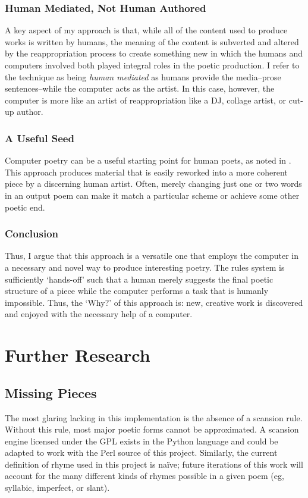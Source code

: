 \documentclass[10pt]{article}
\begin{document}
\subsubsection{Human Mediated, Not Human Authored}
A key aspect of my approach is that, while all of the content used to produce
works is written by humans, the meaning of the content is subverted and altered
by the reappropriation process to create something new in which the humans and
computers involved both played integral roles in the poetic production. I refer
to the technique as being \emph{human mediated} as humans provide the
media--prose sentences--while the computer acts as the artist. In this case,
however, the computer is more like an artist of reappropriation like a DJ,
collage artist, or cut-up author.

\subsubsection{A Useful Seed}
Computer poetry can be a useful starting point for human poets, as noted in
\cite{Hart96}. This approach produces material that is easily reworked into a
more coherent piece by a discerning human artist. Often, merely changing just
one or two words in an output poem can make it match a particular scheme or
achieve some other poetic end.

\subsubsection{Conclusion}
Thus, I argue that this approach is a versatile one that employs the computer in a
necessary and novel way to produce interesting poetry. The rules system is
sufficiently `hands-off' such that a human merely suggests the final poetic
structure of a piece while the computer performs a task that is humanly
impossible. Thus, the `Why?' of this approach is: new, creative work is
discovered and enjoyed with the necessary help of a computer.

\section{Further Research}
\subsection{Missing Pieces}
The most glaring lacking in this implementation is the absence of a scansion
rule. Without this rule, most major poetic forms cannot be approximated. A
scansion engine\cite{scandroid} licensed under the GPL exists in the Python
language and could be adapted to work with the Perl source of this project.
Similarly, the current definition of rhyme used in this project is na\"{i}ve;
future iterations of this work will account for the many different kinds of
rhymes possible in a given poem (eg, syllabic, imperfect, or slant).
\end{document}
